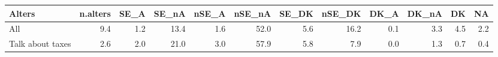 \begin{table}[ht]
\centering
\begin{tabular}{lrrrrrrrrrrr}
  \hline
Alters & n.alters & SE\_A & SE\_nA & nSE\_A & nSE\_nA & SE\_DK & nSE\_DK & DK\_A & DK\_nA & DK & NA \\ 
  \hline
All & 9.4 & 1.2 & 13.4 & 1.6 & 52.0 & 5.6 & 16.2 & 0.1 & 3.3 & 4.5 & 2.2 \\ 
  Talk about taxes & 2.6 & 2.0 & 21.0 & 3.0 & 57.9 & 5.8 & 7.9 & 0.0 & 1.3 & 0.7 & 0.4 \\ 
   \hline
\end{tabular}
\end{table}
